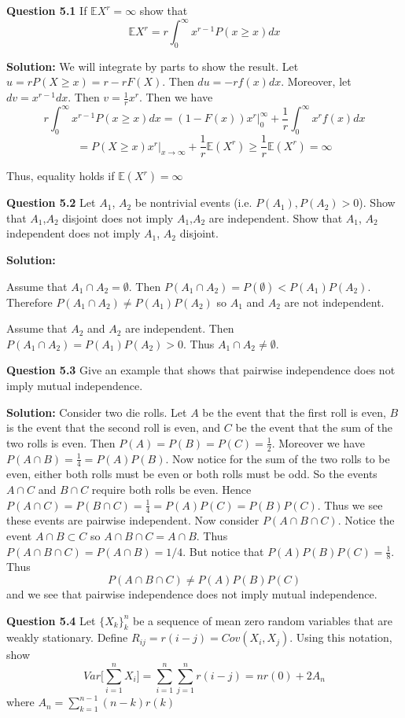 \documentclass[12pt]{article}  %
\newcommand{\E}{{\mathbb{E}}}
\begin{document}
\textbf{Question 5.1} If $\E X^r = \infty$ show that $$\E X^r = r\int_{0}^{\infty}x^{r-1}P(x\geq x)dx$$

\textbf{Solution:} We will integrate by parts to show the result. Let $u = rP(X\geq x) = r - rF(X)$. Then $du = -rf(x)dx$. Moreover, let $dv = x^{r-1}dx$. Then $v = \frac{1}{r}x^{r}$. Then we have 
$$r\int_{0}^{\infty}x^{r-1}P(x\geq x)dx = (1-F(x))x^{r}\bigg|_{0}^{\infty} + \frac{1}{r}\int_{0}^{\infty}x^{r}f(x)dx $$
$$= P(X\geq x)x^{r}\bigg|_{x \to \infty} + \frac{1}{r}\E(X^{r})\geq \frac{1}{r}\E(X^{r}) = \infty$$

Thus, equality holds if $\E(X^{r}) = \infty$
\newpage

\textbf{Question 5.2} Let $A_1$, $A_2$ be nontrivial events (i.e. $P(A_1), P(A_2)>0$). Show that $A_1$,$A_2$ disjoint does not imply $A_1$,$A_2$ are independent. Show that $A_1$, $A_2$ independent does not imply $A_1$, $A_2$ disjoint.

\textbf{Solution:}

 Assume that $A_1\cap A_2 = \emptyset$. Then $P(A_1\cap A_2) = P(\emptyset)<P(A_1)P(A_2)$. Therefore $P(A_1\cap A_2)\neq P(A_1)P(A_2)$ so $A_1$ and $A_2$ are not independent. 

Assume that $A_2$ and $A_2$ are independent. Then $P(A_1\cap A_2)=P(A_1)P(A_2)>0$. Thus $A_1\cap A_2 \neq \emptyset$. 
\newpage

\textbf{Question 5.3} Give an example that shows that pairwise independence does not imply mutual independence. 

\textbf{Solution:} Consider two die rolls. Let $A$ be the event that the first roll is even, $B$ is the event that the second roll is even, and $C$ be the event that the sum of the two rolls is even. Then $P(A) = P(B) = P(C) = \frac{1}{2}$. Moreover we have $P(A\cap B) = \frac{1}{4} = P(A)P(B)$. Now notice for the sum of the two rolls to be even, either both rolls must be even or both rolls must be odd. So the events $A\cap C$ and $B\cap C$ require both rolls be even. Hence $P(A\cap C) = P(B\cap C) = \frac{1}{4} = P(A)P(C) = P(B)P(C)$. Thus we see these events are pairwise independent. Now consider $P(A\cap B \cap C)$. Notice the event $A\cap B \subset C$ so $A\cap B\cap C = A\cap B$. Thus $P(A\cap B \cap C) = P(A\cap B) = 1/4$. But notice that $P(A)P(B)P(C) = \frac{1}{8}$. Thus $$P(A\cap B \cap C)\neq P(A)P(B)P(C)$$
and we see that pairwise independence does not imply mutual independence. 
\newpage

\textbf{Question 5.4} Let $\{X_k\}_k^n$ be a sequence of mean zero random variables that are weakly stationary. Define $R_{ij} = r(i-j) = Cov(X_i, X_j)$. Using this notation, show $$Var\Big[\sum_{i=1}^{n}X_i\Big] = \sum_{i=1}^{n}\sum_{j=1}^{n}r(i-j) = nr(0) + 2 A_n$$ where $A_n = \sum_{k = 1}^{n-1}(n-k)r(k)$
\end{document}
